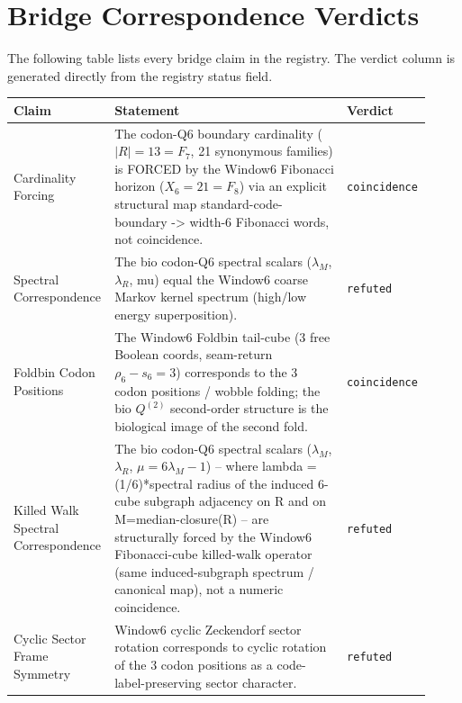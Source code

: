 \section{Bridge Correspondence Verdicts}
The following table lists every bridge claim in the registry.  The verdict column is
generated directly from the registry status field.

\begin{longtable}{>{\raggedright\arraybackslash}p{0.22\linewidth}>{\raggedright\arraybackslash}p{0.55\linewidth}>{\raggedright\arraybackslash}p{0.15\linewidth}}
\textbf{Claim} & \textbf{Statement} & \textbf{Verdict} \\
\hline
Cardinality Forcing & The codon-Q6 boundary cardinality ($|R|=13=F_7$, 21 synonymous families) is FORCED by the Window6 Fibonacci horizon ($X_6=21=F_8$) via an explicit structural map standard-code-boundary -> width-6 Fibonacci words, not coincidence. & \texttt{coincidence} \\
Spectral Correspondence & The bio codon-Q6 spectral scalars ($\lambda_M$, $\lambda_R$, mu) equal the Window6 coarse Markov kernel spectrum (high/low energy superposition). & \texttt{refuted} \\
Foldbin Codon Positions & The Window6 Foldbin tail-cube (3 free Boolean coords, seam-return $\rho_6-s_6=3$) corresponds to the 3 codon positions / wobble folding; the bio $Q^{(2)}$ second-order structure is the biological image of the second fold. & \texttt{coincidence} \\
Killed Walk Spectral Correspondence & The bio codon-Q6 spectral scalars ($\lambda_M$, $\lambda_R$, $\mu=6\lambda_M-1$) -- where lambda = (1/6)*spectral radius of the induced 6-cube subgraph adjacency on R and on M=median-closure(R) -- are structurally forced by the Window6 Fibonacci-cube killed-walk operator (same induced-subgraph spectrum / canonical map), not a numeric coincidence. & \texttt{refuted} \\
Cyclic Sector Frame Symmetry & Window6 cyclic Zeckendorf sector rotation corresponds to cyclic rotation of the 3 codon positions as a code-label-preserving sector character. & \texttt{refuted} \\

\end{longtable}
